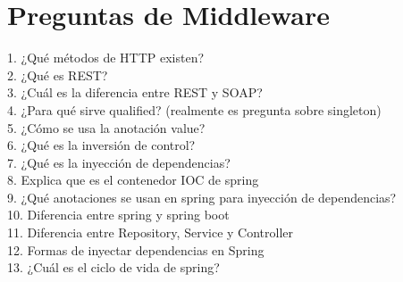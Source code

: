 \section{Preguntas de Middleware}
1.	¿Qué métodos de HTTP existen?\\
2.	¿Qué es REST?\\
3.	¿Cuál es la diferencia entre REST y SOAP?\\
4.	¿Para qué sirve qualified? (realmente es pregunta sobre singleton)\\
5.	¿Cómo se usa la anotación value?\\
6.	¿Qué es la inversión de control?\\
7.	¿Qué es la inyección de dependencias?\\
8.	Explica que es el contenedor IOC de spring\\
9.	¿Qué anotaciones se usan en spring para inyección de dependencias?\\
10.	Diferencia entre spring y spring boot\\
11.	Diferencia entre Repository, Service y Controller\\
12.	Formas de inyectar dependencias en Spring\\
13.	¿Cuál es el ciclo de vida de spring?
